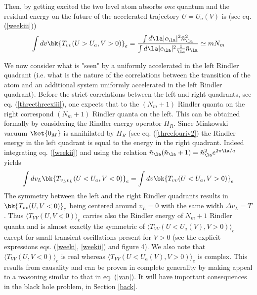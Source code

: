 \documentclass[12pt]{article}
\begin{document}
Then, by getting excited the two level atom absorbs {\it one} quantum
and
the residual energy on the future of the accelerated trajectory $U=U_a(V)$
 is (see eq. (\ref{weekiii}))
\begin{equation}
 \int dv \bk{T_{vv}(U>U_a, V>0 )}_{e} = { \int d \la
\vert c_\la
\vert^2 \tilde n_\la^2  \over \int d \la \vert c_\la
\vert^2 {1 \over \la} \tilde n_\la }
\simeq m N_m
\end{equation}

We now consider what is "seen" by a uniformly accelerated in the
left Rindler quadrant (i.e. what is the nature
of the correlations between the
transition of the atom and an additional  system
uniformly accelerated in the
left Rindler quadrant).
Before the strict correlations between the left and right quadrants, see eq.
(\ref{threethreexiii}), one expects that to the $(N_m+1)$ Rindler quanta
on the right correspond $(N_m+1)$ Rindler quanta
on the left. This can be obtained formally by considering
the Rindler energy operator $H_R$. Since Minkowski vacuum $\ket{0_M}$ is
annihilated by $H_R$ (see
eq. (\ref{threefouriv2})
the Rindler energy in the
left quadrant is equal to the energy in the right quadrant.
Indeed integrating eq. (\ref{weekii}) and using the
relation $\tilde n_\la ( \tilde n_\la + 1) =
\tilde n_\la^2 e^{2\pi \la /a}$
yields
\begin{equation}
\int dv_L \bk{T_{v_Lv_L}(U<U_a, V<0 )}_{e}
= \int dv \bk{T_{vv}(U<U_a, V>0 )}_{e}
\label{twos}
\end{equation}
The symmetry between the left and the right Rindler quadrants results in
$\bk{T_{vv}(U, V<0 )}_{e}$ being centered around $v_L=0$ with the same width
$\Delta v_L=T$.
Thus $\langle T_{VV} (U,V<0) \rangle_e$ carries also the Rindler
energy of $N_m + 1$
Rindler quanta and is almost exactly the symmetric of
$\langle T_{VV} (U<U_a(V),V>0) \rangle_e$ except for small transient
oscillations present for $V>0$
(see the explicit expressions eqs. (\ref{weeki},
\ref{weekii}) and figure 4). We also note that $\langle T_{VV} (U,V<0)
\rangle_e$ is real whereas $\langle T_{VV} (U<U_a(V),V>0) \rangle_e$ is
complex. This results from causality and can be proven in complete generality
by making appeal to a reasoning similar to that in eq. (\ref{van}). It will
have important consequences in the black hole problem, in Section \ref{back}.
\end{document}
